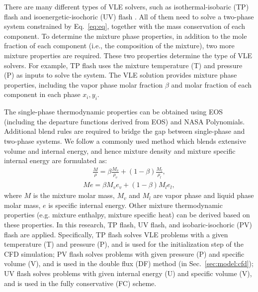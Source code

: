 There are many different types of VLE solvers, such as isothermal-isobaric (TP) flash \cite{michelsen1982isothermal} and isoenergetic-isochoric (UV) flash \cite{saha1997isoenergetic}. All of them need to solve a two-phase system constrained by Eq.~\ref{eq:eq}, together with the mass conservation of each component. To determine the mixture phase properties, in addition to the mole fraction of each component (i.e., the composition of the mixture), two more mixture properties are required. These two properties determine the type of VLE solvers. For example, TP flash uses the mixture temperature (T) and pressure (P) as inputs to solve the system. The VLE solution provides mixture phase properties, including the vapor phase molar fraction $\beta$ and molar fraction of each component in each phase $x_i,y_i$. 

The single-phase thermodynamic properties can be obtained using EOS (including the departure functions derived from EOS) and NASA Polynomials. Additional blend rules are required to bridge the gap between single-phase and two-phase systems. We follow a commonly used method which blends \cite{matheis2018multi,tudisco2020numerical} extensive volume and internal energy, and hence mixture density and mixture specific internal energy are formulated as:
\begin{align} \frac{M}{\rho} = \beta \frac{M_v}{\rho_v}+\left(1-\beta\right)\frac{M_l}{\rho_l}, \label{eq:rho}
\end{align}
\begin{align} Me = \beta M_v e_v + \left(1-\beta\right)M_l e_l, \label{eq:e}
\end{align}
where $M$ is the mixture molar mass, $M_v$ and $M_l$ are vapor phase and liquid phase molar mass, $e$ is specific internal energy. 
Other mixture thermodynamic properties (e.g. mixture enthalpy, mixture specific heat) can be derived based on these properties. 
In this research, TP flash, UV flash, and isobaric-isochoric (PV) flash are applied. Specifically, 
TP flash solves VLE problems with a given temperature (T) and pressure (P), and is used for the initialization step of the CFD simulation; PV flash solves problems with given pressure (P) and specific volume (V), and is used in the double flux (DF) method (in Sec.~\ref{sec:model:cfd}); UV flash solves problems with given internal energy (U) and specific volume (V), and is used in the fully conservative (FC) scheme. 


